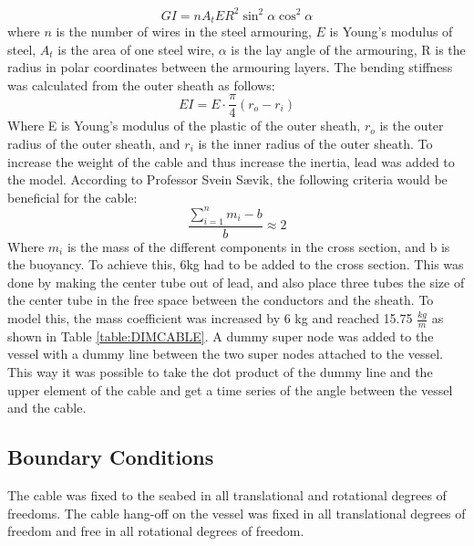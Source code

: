 \begin{equation}
    GI=nA_t E R^2 \sin^2 \alpha \cos^2 \alpha
\end{equation}
where $n$ is the number of wires in the steel armouring, $E$ is Young's modulus of steel, $A_t$ is the area of one steel wire, $\alpha$ is the lay angle of the armouring, R is the radius in polar coordinates between the armouring layers.  \newline
\newline 
The bending stiffness was calculated from the outer sheath as follows:
\begin{equation}
    EI= E\cdot \frac{\pi}{4}(r_o-r_i)
\end{equation}
Where E is Young's modulus of the plastic of the outer sheath, $r_o$ is the outer radius of the outer sheath, and $r_i$ is the inner radius of the outer sheath. \newline
\newline 
To increase the weight of the cable and thus increase the inertia, lead was added to the model. According to Professor Svein Sævik, the following criteria would be beneficial for the cable:
\begin{equation}
    \frac{\sum_{i=1}^n m_i - b}{b}\approx 2
\end{equation}
Where $m_i$ is the mass of the different components in the cross section, and b is the buoyancy. To achieve this, 6kg had to be added to the cross section. This was done by making the center tube out of lead, and also place three tubes the size of the center tube in the free space between the conductors and the sheath. To model this, the mass coefficient was increased by 6 kg and reached 15.75 $\frac{kg}{m}$ as shown in Table \ref{table:DIMCABLE}. \newline
\newline A dummy super node was added to the vessel with a dummy line between the two super nodes attached to the vessel. This way it was possible to take the dot product of the dummy line and the upper element of the cable and get a time series of the angle between the vessel and the cable.

\subsection{Boundary Conditions}
The cable was fixed to the seabed in all translational and rotational degrees of freedoms. The cable hang-off on the vessel was fixed in all translational degrees of freedom and free in all rotational degrees of freedom. 


